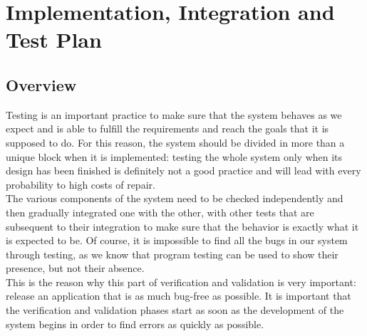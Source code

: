 \documentclass[]{article}
\begin{document}
		
		\newpage
		
		\section{Implementation, Integration and Test Plan}
			 \bigskip
			 
			 \subsection{Overview}
			 \medskip
			 Testing is an important practice to make sure that the system behaves as we expect and is able to fulfill the requirements and reach the goals that it is supposed to do. For this reason, the system should be divided in more than a unique block when it is implemented: testing the whole system only when its design has been finished is definitely not a good practice and will lead with every probability to high costs of repair. \\The various components of the system need to be checked independently and then gradually integrated one with the other, with other tests that are subsequent to their integration to make sure that the behavior is exactly what it is expected to be. Of course, it is impossible to find all the bugs in our system through testing, as we know that program testing can be used to show their presence, but not their absence. \\This is the reason why this part of verification and validation is very important: release an application that is as much bug-free as possible. It is important that the verification and validation phases start as soon as the development of the system begins in order to find errors as quickly as possible.\newline\newline
			
\end{document}
